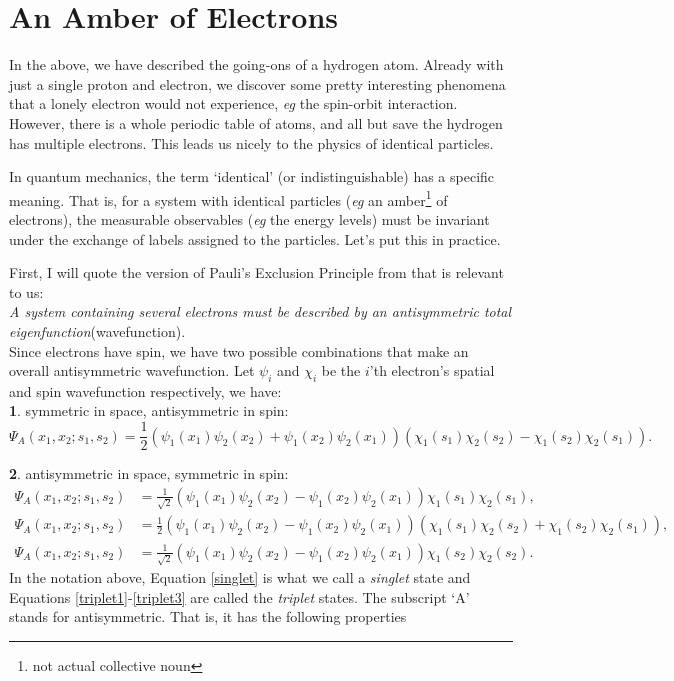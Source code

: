 \documentclass{article}
\numberwithin{equation}{section} %
\begin{document}
\section{An Amber of Electrons}
In the above, we have described the going-ons of a hydrogen atom. Already with just a single proton and electron, we discover some pretty interesting phenomena that a lonely electron would not experience, \textit{eg} the spin-orbit interaction. However, there is a whole periodic table of atoms, and all but save the hydrogen has multiple electrons. This leads us nicely to the physics of identical particles.

In quantum mechanics, the term `identical' (or indistinguishable) has a specific meaning. That is, for a system with identical particles (\textit{eg} an amber\footnote{not actual collective noun} of electrons), the measurable observables (\textit{eg} the energy levels) must be invariant under the exchange of labels assigned to the particles. Let's put this in practice. 

First, I will quote the version of Pauli's Exclusion Principle from \cite{eisberg} that is relevant to us:\\

\noindent \textit{A system containing several electrons must be described by an antisymmetric total eigenfunction}(wavefunction).\\

Since electrons have spin, we have two possible combinations that make an overall antisymmetric wavefunction. Let $\psi_i$ and $\chi_i$ be the $i$'th electron's spatial and spin wavefunction respectively, we have: \\

\noindent\textbf{1}. symmetric in space, antisymmetric in spin:
\begin{equation}
\Psi_A(x_1,x_2;s_1,s_2)=\frac{1}{2}\left(\psi_1(x_1)\psi_2(x_2) + \psi_1(x_2)\psi_2(x_1) \right) \left( \chi_1(s_1)\chi_2(s_2) - \chi_1(s_2)\chi_2(s_1) \right).
\label{singlet}
\end{equation}

\noindent\textbf{2}. antisymmetric in space, symmetric in spin:
\begin{align}
\Psi_A(x_1,x_2;s_1,s_2) &=\frac{1}{\sqrt{2}}\left(\psi_1(x_1)\psi_2(x_2) - \psi_1(x_2)\psi_2(x_1) \right) \chi_1(s_1)\chi_2(s_1),\label{triplet1}\\
\Psi_A(x_1,x_2;s_1,s_2) &=\frac{1}{2}\left(\psi_1(x_1)\psi_2(x_2) - \psi_1(x_2)\psi_2(x_1) \right) \left( \chi_1(s_1)\chi_2(s_2) + \chi_1(s_2)\chi_2(s_1) \right),\label{triplet2}\\
\Psi_A(x_1,x_2;s_1,s_2) &=\frac{1}{\sqrt{2}}\left(\psi_1(x_1)\psi_2(x_2) - \psi_1(x_2)\psi_2(x_1) \right) \chi_1(s_2)\chi_2(s_2)\label{triplet3}.
\end{align}
In the notation above, Equation \ref{singlet} is what we call a \textit{singlet} state and Equations \ref{triplet1}-\ref{triplet3} are called the \textit{triplet} states. The subscript `A' stands for antisymmetric. That is, it has the following properties
\end{document}
